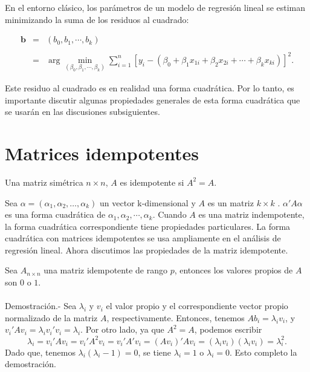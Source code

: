En el entorno clásico, los parámetros de un modelo de regresión lineal se estiman minimizando la suma de los residuos al cuadrado:

$$
\begin{array}{rcl}
    \textbf{b} &=& (b_0,b_1,\cdots, b_k)\\\\
	       &=& \arg\min_{(\beta_0,\beta_1,\cdots,\beta_k)}\displaystyle\sum_{i=1}^n \left[y_i-\left(\beta_0+\beta_1x_{1i}+\beta_2x_{2i}+\cdots+\beta_{k}x_{ki}\right)\right]^2.
\end{array}
$$

Este residuo al cuadrado es en realidad una forma cuadrática. Por lo tanto, es importante discutir algunas propiedades generales de esta forma cuadrática que se usarán en las discusiones subsiguientes.


\section{Matrices idempotentes}

\begin{def.}
    Una matriz simétrica $n\times n$, $A$ es idempotente si $A^2=A.$
\end{def.}

Sea $\alpha=(\alpha_1,\alpha_2,\ldots,\alpha_k)$ un vector k-dimensional y $A$ es un matriz $k\times k$ . $\alpha'A\alpha$ es una forma cuadrática de $\alpha_1,\alpha_2,\cdots,\alpha_k$. Cuando $A$ es una matriz indempotente, la forma cuadrática correspondiente tiene propiedades particulares. La forma cuadrática con matrices idempotentes se usa ampliamente en el análisis de regresión lineal. Ahora discutimos las propiedades de la matriz idempotente.

\begin{teo}
    Sea $A_{n\times n}$ una matriz idempotente de rango $p$, entonces los valores propios de $A$ son $0$ o $1$.\\\\
	Demostración.-\; Sea $\lambda_i$ y $v_i$ el valor propio y el correspondiente vector propio normalizado de la matriz $A$, respectivamente. Entonces, tenemos $Ab_i=\lambda_iv_i$, y $v_i' Av_i=\lambda_iv_i' v_i=\lambda_i$. Por otro lado, ya que $A^2=A$, podemos escribir
	$$\lambda_i=v_i'Av_i=v_i'A^2v_i=v_i'A'v_i=(Av_i)'Av_i=(\lambda_iv_i)(\lambda_iv_i)=\lambda_i^2.$$
	Dado que, tenemos $\lambda_i(\lambda_i-1)=0$, se tiene $\lambda_i=1$ o $\lambda_i=0$. Esto completo la demostración.
\end{teo}

